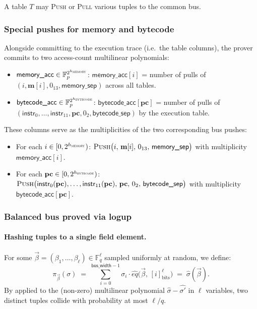 \documentclass{article}
\theoremstyle{definition}
\newcommand{\Fp}{\mathbb F_p}
\newcommand{\Fq}{\mathbb F_q}
\begin{document}
A table $T$ may \textsc{Push} or \textsc{Pull} various tuples to the common bus.

\subsubsection{Special pushes for memory and bytecode}\label{sec:special-pushes}

Alongside committing to the execution trace (i.e.\ the table columns), the prover commits to two access-count multilinear polynomials:
\begin{itemize}
    \item $\textsf{memory\_acc} \in \Fp^{2^{h_\textsc{memory}}}$: $\textsf{memory\_acc}[i]$ = number of pulls of $(i, \textbf{m}[i], 0_{13}, \textsf{memory\_sep})$ across all tables.
    \item $\textsf{bytecode\_acc} \in \Fp^{2^{h_\textsc{bytecode}}}$: $\textsf{bytecode\_acc}[\textbf{pc}]$ = number of pulls of $(\textsf{instr}_0, \dots, \textsf{instr}_{11}, \textbf{pc}, 0_2, \textsf{bytecode\_sep})$ by the execution table.
\end{itemize}
These columns serve as the multiplicities of the two corresponding bus pushes:
\begin{itemize}
    \item For each $i \in [0, 2^{h_\textsc{memory}})$: $\textsc{Push}\big(i,\, \textbf{m}[i],\, 0_{13},\, \textsf{memory\_sep}\big)$ with multiplicity $\textsf{memory\_acc}[i]$.
    \item For each $\textbf{pc} \in [0, 2^{h_\textsc{bytecode}})$: $\textsc{Push}\big(\textsf{instr}_0(\textbf{pc}), \dots, \textsf{instr}_{11}(\textbf{pc}),\, \textbf{pc},\, 0_2,\, \textsf{bytecode\_sep}\big)$ with multiplicity $\textsf{bytecode\_acc}[\textbf{pc}]$.
\end{itemize}

\subsubsection{Balanced bus proved via logup}

\paragraph{Hashing tuples to a single field element.} For some $\vec\beta = (\beta_1, \ldots, \beta_\ell) \in \Fq^\ell$ sampled uniformly at random, we define:
\[
\pi_{\vec\beta}(\sigma) \;=\; \sum_{i=0}^{\textsf{bus\_width} - 1} \sigma_i \cdot \hat{eq}\big(\vec\beta,\, [i]_\text{bits}^\ell\big) \;=\; \hat{\sigma}(\vec\beta).
\]
By  applied to the (non-zero) multilinear polynomial $\hat\sigma - \hat{\sigma'}$ in $\ell$ variables, two distinct tuples collide with probability at most $\ell/q$.
\end{document}
